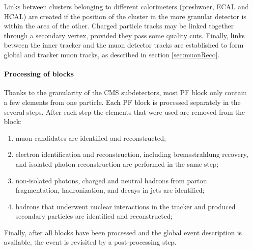 Links between clusters belonging to different calorimeters (preshwoer, ECAL and HCAL) are created if the position of the cluster in the more granular detector is within the area of the other.
Charged particle tracks may be linked together through a secondary vertex, provided they pass some quality cuts.
Finally, links between the inner tracker and the muon detector tracks are established to form global and tracker muon tracks, as described in section \ref{sec:muonReco}.

\paragraph{Processing of blocks\\}

Thanks to the granularity of the CMS subdetectors, most PF block only contain a few elements from one particle.
Each PF block is processed separately in the several steps. After each step the elements that were used are removed from the block:
\begin{enumerate}
\item muon candidates are identified and reconstructed;
\item electron identification and reconstruction, including bremsstrahlung recovery, and isolated photon reconstruction are performed in the same step;
\item non-isolated photons, charged and neutral hadrons from parton fragmentation, hadronization, and decays in jets are identified;
\item hadrons that underwent nuclear interactions in the tracker and produced secondary particles are identified and reconstructed;
\end{enumerate}
Finally, after all blocks have been processed and the global event description is available, the event is revisited by a post-processing step.
